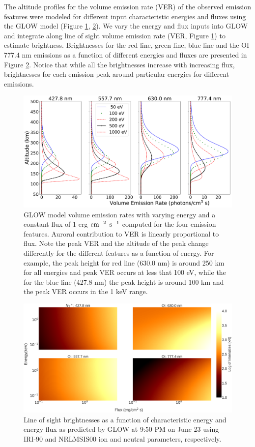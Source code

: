 \documentclass[crop=false,class=mitthesis,oneside,font=12pt]{standalone}
\begin{document}
 The altitude profiles for the volume emission rate (VER) of the observed emission features were modeled for different input characteristic energies and fluxes using the GLOW model (Figure \ref{fig:vve}, \ref{fig:bve}). 
We vary the energy and flux inputs into GLOW and integrate along line of sight volume emission rate (VER, Figure \ref{fig:vve}) to estimate brightness. Brightnesses for the red line, green line, blue line and the OI 777.4 nm emissions as a function of different energies and fluxes are presented in Figure \ref{fig:bve}. Notice that while all the brightnesses increase with increasing flux, brightnesses for each emission peak around particular energies for different emissions.
\begin{figure}[H]
	\centering\includegraphics[width=35pc]{ver_vs_e.pdf}
	\caption{GLOW model volume emission rates with varying energy and a constant flux of 1 erg $\rm cm^{-2}$ $\rm s^{-1}$ computed for the four emission features. Auroral contribution to VER is linearly proportional to flux. Note the peak VER and the altitude of the peak change differently for the different features as a function of energy. For
		example, the peak height for red line (630.0 nm) is around 250 km for all energies and peak VER occurs at less that 100 eV, while the for the blue line (427.8 nm) the peak height is around 100 km and the peak VER occurs in the 1 keV range.}
	\label{fig:vve}
\end{figure}
\begin{figure}[H]
	\centering\includegraphics[width=35pc]{b_vs_e.pdf}
	\caption{Line of sight brightnesses as a function of characteristic energy and energy flux as predicted by GLOW at 9:50 PM on June 23 using IRI-90 and NRLMSIS00 ion and neutral parameters, respectively.}
	\label{fig:bve}
\end{figure}
\end{document}
